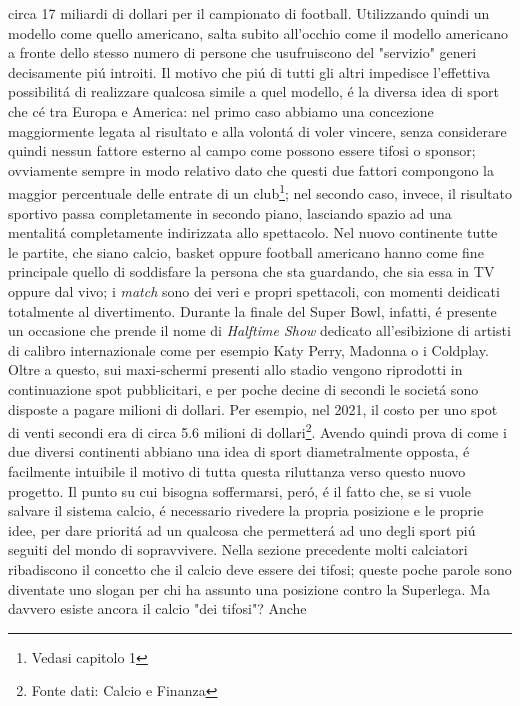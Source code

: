 \documentclass[
    corpo=12pt,
    oneside,
    evenboxes,
    tipotesi=triennale,
    stile=classica,
    oldstyle,
    autoretitolo,
    greek,
]{toptesi}
\begin{document}
\begin{interlinea}{1.5}
circa 17 miliardi di dollari per il campionato di football. Utilizzando quindi un modello come quello americano, salta subito all'occhio come 
il modello americano a fronte dello stesso numero di persone che usufruiscono del "servizio" generi decisamente pi\'u introiti. Il motivo che pi\'u 
di tutti gli altri impedisce l'effettiva possibilit\'a di realizzare qualcosa simile a quel modello, \'e la diversa idea di sport che c\'e tra
Europa e America: nel primo caso abbiamo una concezione maggiormente legata al risultato e alla volont\'a di voler vincere, senza considerare quindi
nessun fattore esterno al campo come possono essere tifosi o sponsor; ovviamente sempre in modo relativo dato che questi due fattori compongono la 
maggior percentuale delle entrate di un club\footnote{Vedasi capitolo 1}; nel secondo caso, invece, il risultato sportivo passa completamente in secondo piano,
lasciando spazio ad una mentalit\'a completamente indirizzata allo spettacolo. Nel nuovo continente tutte le partite, che siano calcio, basket 
oppure football americano hanno come fine principale quello di soddisfare la persona che sta guardando, che sia essa in TV oppure dal vivo;
i \emph{match} sono dei veri e propri spettacoli, con momenti deidicati totalmente al divertimento. Durante la finale del Super Bowl, infatti,
\'e presente un occasione che prende il nome di \emph{Halftime Show} dedicato all'esibizione di artisti di calibro internazionale come per esempio 
Katy Perry, Madonna o i Coldplay. Oltre a questo, sui maxi-schermi presenti allo stadio vengono riprodotti in continuazione spot pubblicitari, 
e per poche decine di secondi le societ\'a sono disposte a pagare milioni di dollari. Per esempio, nel 2021, il costo per uno spot di venti secondi 
era di circa 5.6 milioni di dollari\footnote{Fonte dati: Calcio e Finanza}.\newline
Avendo quindi prova di come i due diversi continenti abbiano una idea di sport diametralmente opposta, \'e facilmente intuibile il motivo di tutta questa riluttanza
verso questo nuovo progetto. Il punto su cui bisogna soffermarsi, per\'o, \'e il fatto che, se si vuole salvare il sistema calcio, \'e necessario
rivedere la propria posizione e le proprie idee, per dare priorit\'a ad un qualcosa che permetter\'a ad uno degli sport pi\'u seguiti del mondo
di sopravvivere. Nella sezione precedente molti calciatori ribadiscono il concetto che il calcio deve essere dei tifosi; queste poche parole
sono diventate uno slogan per chi ha assunto una posizione contro la Superlega. Ma davvero esiste ancora il calcio "dei tifosi"? Anche 

\end{interlinea}
\end{document}
